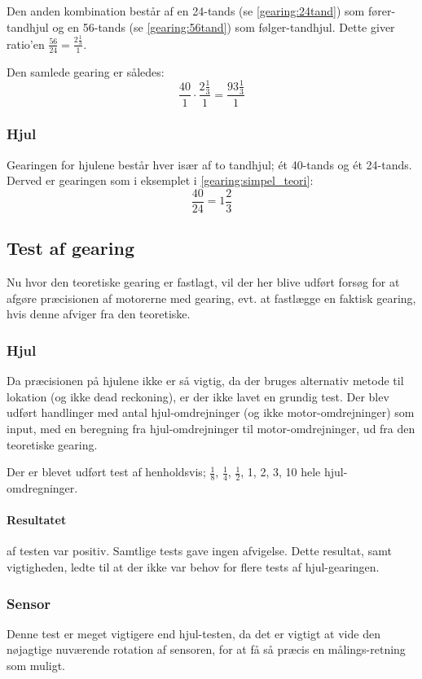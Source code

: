 Den anden kombination består af en 24-tands (se \cref{gearing:24tand}) som fører-tandhjul og en 56-tands (se \cref{gearing:56tand}) som følger-tandhjul.
Dette giver ratio'en $\frac{56}{24} = \frac{2\frac{1}{3}}{1}$.

Den samlede gearing er således: $$\frac{40}{1} \cdot \frac{2\frac{1}{3}}{1} = \frac{93 \frac{1}{3}}{1}$$

\subsubsection{Hjul}
Gearingen for hjulene består hver især af to tandhjul; ét 40-tands og ét 24-tands.
Derved er gearingen som i eksemplet i \cref{gearing:simpel_teori}: $$ \frac{40}{24} = 1 \frac{2}{3} $$

\subsection{Test af gearing}
Nu hvor den teoretiske gearing er fastlagt, vil der her blive udført forsøg for at afgøre præcisionen af motorerne med gearing, evt. at fastlægge en faktisk gearing, hvis denne afviger fra den teoretiske.

\subsubsection{Hjul}
Da præcisionen på hjulene ikke er så vigtig, da der bruges alternativ metode til lokation (og ikke dead reckoning), er der ikke lavet en grundig test.
Der blev udført handlinger med antal hjul-omdrejninger (og ikke motor-omdrejninger) som input, med en beregning fra hjul-omdrejninger til motor-omdrejninger, ud fra den teoretiske gearing.

Der er blevet udført test af henholdsvis; $\frac{1}{8}$, $\frac{1}{4}$, $\frac{1}{2}$, 1, 2, 3, 10 hele hjul-omdregninger.

\paragraph{Resultatet} af testen var positiv.
Samtlige tests gave ingen afvigelse.
Dette resultat, samt vigtigheden, ledte til at der ikke var behov for flere tests af hjul-gearingen.

\subsubsection{Sensor}
Denne test er meget vigtigere end hjul-testen, da det er vigtigt at vide den nøjagtige nuværende rotation af sensoren, for at få så præcis en målings-retning som muligt.

